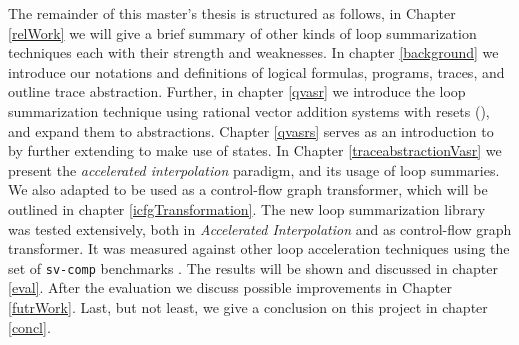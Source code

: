 The remainder of this master's thesis is structured as follows, in Chapter \ref{relWork} we will give a brief summary of other kinds of loop summarization techniques each with their strength and weaknesses. In chapter \ref{background} we introduce our notations and definitions of logical formulas, programs, traces, and outline trace abstraction. Further, in chapter \ref{qvasr} we introduce the loop summarization technique using rational vector addition systems with resets (\qvasr), and expand them to \qvasr abstractions. Chapter \ref{qvasrs} serves as an introduction to \qvasrs by further extending \qvasr to make use of states. In Chapter \ref{traceabstractionVasr} we present the \textsl{accelerated interpolation} paradigm, and its usage of \qvasr loop summaries. We also adapted \qvasr to be used as a control-flow graph transformer, which will be outlined in chapter \ref{icfgTransformation}. The new loop summarization library was tested extensively, both in \textsl{Accelerated Interpolation} and as control-flow graph transformer. It was measured against other loop acceleration techniques using the set of \texttt{sv-comp} benchmarks \cite{svcomp}. The results will be shown and discussed in chapter \ref{eval}. After the evaluation we discuss possible improvements in Chapter \ref{futrWork}. Last, but not least, we give a conclusion on this project in chapter \ref{concl}.

